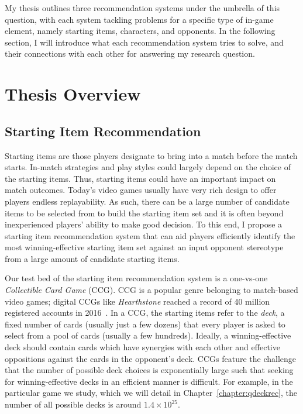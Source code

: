 My thesis outlines three recommendation systems under the umbrella of this question, with each system tackling problems for a specific type of in-game element, namely starting items, characters, and opponents. In the following section, I will introduce what each recommendation system tries to solve, and their connections with each other for answering my research question.

\section{Thesis Overview}\label{sec:thesis_overview}

\subsection{Starting Item Recommendation}

Starting items are those players designate to bring into a match before the match starts. In-match strategies and play styles could largely depend on the choice of the starting items. Thus, starting items could have an important impact on match outcomes. Today's video games usually have very rich design to offer players endless replayability. As such, there can be a large number of candidate items to be selected from to build the starting item set and it is often beyond inexperienced players' ability to make good decision. To this end, I propose a starting item recommendation system that can aid players efficiently identify the most winning-effective starting item set against an input opponent stereotype from a large amount of candidate starting items. 

Our test bed of the starting item recommendation system is a one-vs-one \textit{Collectible Card Game} (CCG). CCG is a popular genre belonging to match-based video games; digital CCGs like \textit{Hearthstone} reached a record of 40 million registered accounts in 2016~\cite{hearthstonepopular}. In a CCG, the starting items refer to the \textit{deck}, a fixed number of cards (usually just a few dozens) that every player is asked to select from a pool of cards (usually a few hundreds). Ideally, a winning-effective deck should contain cards which have synergies with each other and effective oppositions against the cards in the opponent's deck. CCGs feature the challenge that the number of possible deck choices is exponentially large such that seeking for winning-effective decks in an efficient manner is difficult. For example, in the particular game we study, which we will detail in Chapter~\ref{chapter:qdeckrec}, the number of all possible decks is around $1.4 \times 10^{25}$. 

